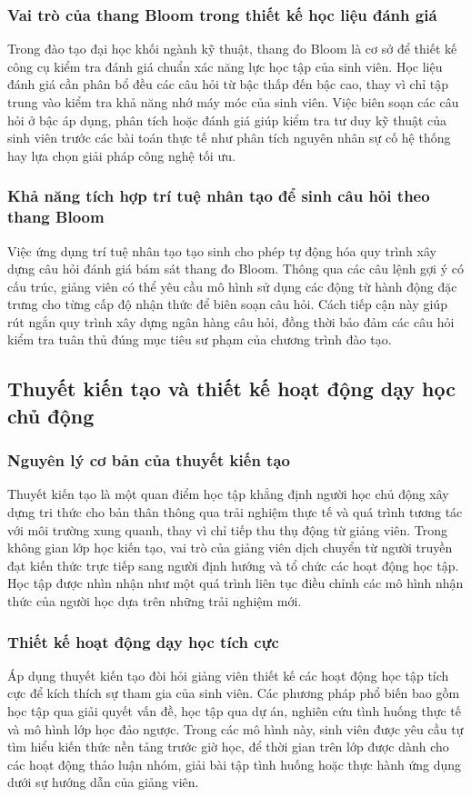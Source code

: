 \subsubsection{Vai trò của thang Bloom trong thiết kế học liệu đánh giá}
Trong đào tạo đại học khối ngành kỹ thuật, thang đo Bloom là cơ sở để thiết kế công cụ kiểm tra đánh giá chuẩn xác năng lực học tập của sinh viên. Học liệu đánh giá cần phân bổ đều các câu hỏi từ bậc thấp đến bậc cao, thay vì chỉ tập trung vào kiểm tra khả năng nhớ máy móc của sinh viên. Việc biên soạn các câu hỏi ở bậc áp dụng, phân tích hoặc đánh giá giúp kiểm tra tư duy kỹ thuật của sinh viên trước các bài toán thực tế như phân tích nguyên nhân sự cố hệ thống hay lựa chọn giải pháp công nghệ tối ưu.

\subsubsection{Khả năng tích hợp trí tuệ nhân tạo để sinh câu hỏi theo thang Bloom}
Việc ứng dụng trí tuệ nhân tạo tạo sinh cho phép tự động hóa quy trình xây dựng câu hỏi đánh giá bám sát thang đo Bloom. Thông qua các câu lệnh gợi ý có cấu trúc, giảng viên có thể yêu cầu mô hình sử dụng các động từ hành động đặc trưng cho từng cấp độ nhận thức để biên soạn câu hỏi. Cách tiếp cận này giúp rút ngắn quy trình xây dựng ngân hàng câu hỏi, đồng thời bảo đảm các câu hỏi kiểm tra tuân thủ đúng mục tiêu sư phạm của chương trình đào tạo.

\subsection{Thuyết kiến tạo và thiết kế hoạt động dạy học chủ động}

\subsubsection{Nguyên lý cơ bản của thuyết kiến tạo}
Thuyết kiến tạo là một quan điểm học tập khẳng định người học chủ động xây dựng tri thức cho bản thân thông qua trải nghiệm thực tế và quá trình tương tác với môi trường xung quanh, thay vì chỉ tiếp thu thụ động từ giảng viên. Trong không gian lớp học kiến tạo, vai trò của giảng viên dịch chuyển từ người truyền đạt kiến thức trực tiếp sang người định hướng và tổ chức các hoạt động học tập. Học tập được nhìn nhận như một quá trình liên tục điều chỉnh các mô hình nhận thức của người học dựa trên những trải nghiệm mới.

\subsubsection{Thiết kế hoạt động dạy học tích cực}
Áp dụng thuyết kiến tạo đòi hỏi giảng viên thiết kế các hoạt động học tập tích cực để kích thích sự tham gia của sinh viên. Các phương pháp phổ biến bao gồm học tập qua giải quyết vấn đề, học tập qua dự án, nghiên cứu tình huống thực tế và mô hình lớp học đảo ngược. Trong các mô hình này, sinh viên được yêu cầu tự tìm hiểu kiến thức nền tảng trước giờ học, để thời gian trên lớp được dành cho các hoạt động thảo luận nhóm, giải bài tập tình huống hoặc thực hành ứng dụng dưới sự hướng dẫn của giảng viên.

